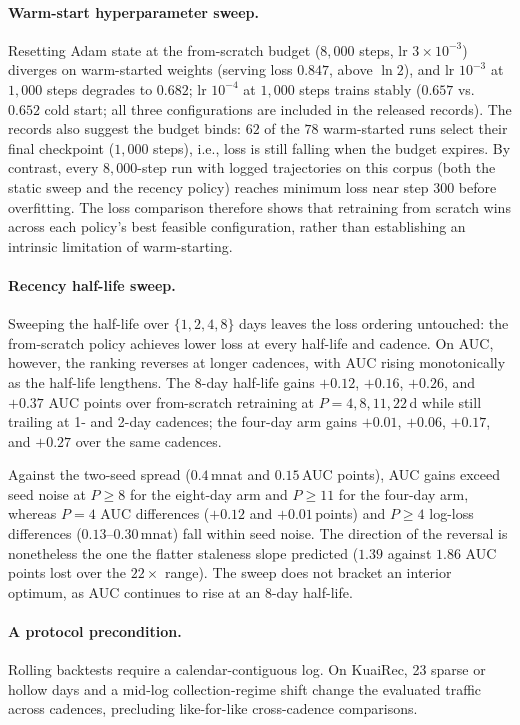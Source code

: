 \documentclass[10pt,letterpaper]{article}
\begin{document}
\paragraph{Warm-start hyperparameter sweep.}
Resetting Adam state at the from-scratch budget ($8{,}000$ steps, lr
$3{\times}10^{-3}$) diverges on warm-started weights (serving loss $0.847$,
above $\ln 2$), and lr $10^{-3}$ at $1{,}000$ steps degrades to $0.682$; lr
$10^{-4}$ at $1{,}000$ steps trains stably ($0.657$ vs.\ $0.652$ cold start;
all three configurations are included in the released records). The records also
suggest the budget binds: $62$ of the $78$ warm-started runs select their final
checkpoint ($1{,}000$ steps), i.e., loss is still falling when the budget
expires. By contrast, every $8{,}000$-step run with logged trajectories on this
corpus (both the static sweep and the recency policy) reaches minimum loss near
step $300$ before overfitting. The loss comparison therefore shows that
retraining from scratch wins across each policy's best feasible configuration,
rather than establishing an intrinsic limitation of warm-starting.

\paragraph{Recency half-life sweep.}
Sweeping the half-life over $\{1, 2, 4, 8\}$ days leaves the loss ordering
untouched: the from-scratch policy achieves lower loss at every half-life and
cadence. On AUC, however, the ranking reverses at longer cadences, with AUC
rising monotonically as the half-life lengthens. The 8-day half-life gains
$+0.12$, $+0.16$, $+0.26$, and $+0.37$ AUC points over from-scratch retraining
at $P = 4, 8, 11, 22$\,d while still trailing at 1- and 2-day cadences; the
four-day arm gains $+0.01$, $+0.06$, $+0.17$, and $+0.27$ over the same
cadences.

Against the two-seed spread ($0.4$\,mnat and $0.15$\,AUC points), AUC gains
exceed seed noise at $P \ge 8$ for the eight-day arm and $P \ge 11$ for the
four-day arm, whereas $P = 4$ AUC differences ($+0.12$ and $+0.01$\,points)
and $P \ge 4$ log-loss differences ($0.13$--$0.30$\,mnat) fall within seed
noise. The direction of the reversal is nonetheless the one the flatter
staleness slope predicted ($1.39$ against $1.86$ AUC points lost over the
$22\times$ range). The sweep does not bracket an interior optimum, as AUC
continues to rise at an 8-day half-life.

\paragraph{A protocol precondition.}
Rolling backtests require a calendar-contiguous log. On KuaiRec, 23
sparse or hollow days and a mid-log collection-regime shift change the evaluated
traffic across cadences, precluding like-for-like cross-cadence comparisons.
\end{document}
